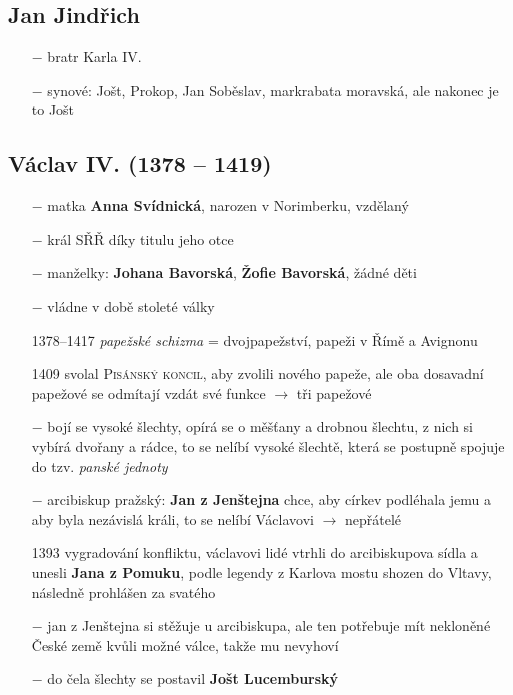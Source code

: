 \documentclass{article}
\begin{document}
\subsection*{Jan Jindřich}
\begin{itemize}
    \vspace{-0.5em}
    \setlength\itemsep{0.15em}
    \item[$-$] bratr Karla IV.
    \item[$-$] synové: Jošt, Prokop, Jan Soběslav, markrabata moravská, ale nakonec je to Jošt
\end{itemize}

\subsection*{Václav IV. (1378 -- 1419)}
\begin{itemize}
    \vspace{-0.5em}
    \setlength\itemsep{0.15em}
    \item[$-$] matka \textbf{Anna Svídnická}, narozen v Norimberku, vzdělaný
    \item[$-$] král SŘŘ díky titulu jeho otce
    \item[$-$] manželky: \textbf{Johana Bavorská}, \textbf{Žofie Bavorská}, žádné děti
    \item[$-$] vládne v době stoleté války
    \item[1378--1417] \textit{papežské schizma} = dvojpapežství, papeži v Římě a Avignonu
    \item[1409] svolal \textsc{Pisánský koncil}, aby zvolili nového papeže, ale oba dosavadní papežové se odmítají vzdát své funkce $\rightarrow$ tři papežové
    \item[$-$] bojí se vysoké šlechty, opírá se o měšťany a drobnou šlechtu, z nich si vybírá dvořany a rádce, to se nelíbí vysoké šlechtě, která se postupně spojuje do tzv. \textit{panské jednoty}
    \item[$-$] arcibiskup pražský: \textbf{Jan z Jenštejna} chce, aby církev podléhala jemu a aby byla nezávislá králi, to se nelíbí Václavovi $\rightarrow$ nepřátelé
    \item[1393] vygradování konfliktu, václavovi lidé vtrhli do arcibiskupova sídla a unesli \textbf{Jana z Pomuku}, podle legendy z Karlova mostu shozen do Vltavy, následně prohlášen za svatého
    \item[$-$] jan z Jenštejna si stěžuje u arcibiskupa, ale ten potřebuje mít nekloněné České země kvůli možné válce, takže mu nevyhoví
    \item[$-$] do čela šlechty se postavil \textbf{Jošt Lucemburský}

\end{itemize}
\end{document}
